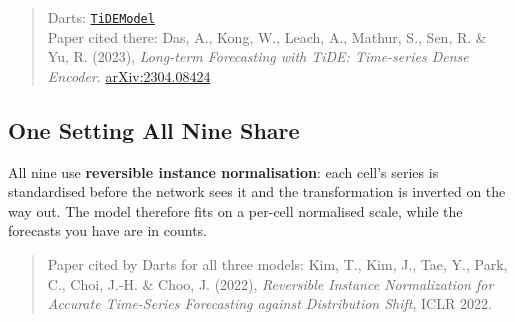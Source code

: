 \begin{quote}
\small
Darts: \href{https://unit8co.github.io/darts/generated_api/darts.models.forecasting.tide_model.html}%
{\texttt{TiDEModel}} \\
Paper cited there: Das, A., Kong, W., Leach, A., Mathur, S., Sen, R. \& Yu, R. (2023),
\textit{Long-term Forecasting with TiDE: Time-series Dense Encoder}.
\href{https://arxiv.org/abs/2304.08424}{arXiv:2304.08424}
\end{quote}

\subsection*{One Setting All Nine Share}

All nine use \textbf{reversible instance normalisation}: each cell's series is standardised before
the network sees it and the transformation is inverted on the way out. The model therefore fits on
a per-cell normalised scale, while the forecasts you have are in counts.

\begin{quote}
\small
Paper cited by Darts for all three models: Kim, T., Kim, J., Tae, Y., Park, C., Choi, J.-H. \&
Choo, J. (2022), \textit{Reversible Instance Normalization for Accurate Time-Series Forecasting
against Distribution Shift}, ICLR 2022.
\end{quote}
